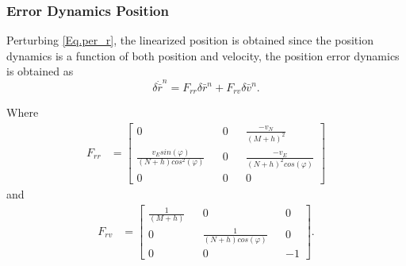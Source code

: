 \subsubsection{Error Dynamics Position}
Perturbing \eqref{Eq.per_r}, the linearized position is obtained since the position dynamics is a function of both position and velocity, the position error dynamics is obtained as
\begin{equation}
\delta \dot{\bar{r}}^n = F_{rr}\delta \bar{r}^n + F_{rv}\delta \bar{v}^n.
\end{equation}

\noindent Where
\begin{align}
F_{rr} &=
\begin{bmatrix}
0 && 0 && \frac{-v_N}{(M+h)^2}\\
\frac{v_E sin(\varphi)}{(N+h)cos^2(\varphi)} && 0 && \frac{-v_E}{(N+h)^2cos(\varphi)} \\
0 && 0 && 0
\end{bmatrix}
\label{Eq.Frr}
\end{align}
and
\begin{align}
F_{rv} &=
\begin{bmatrix}
\frac{1}{(M+h)} && 0 && 0\\
0 && \frac{1}{(N+h)cos(\varphi)} && 0 \\
0 && 0 && -1
\end{bmatrix}.
\label{Eq.Frv}
\end{align}
